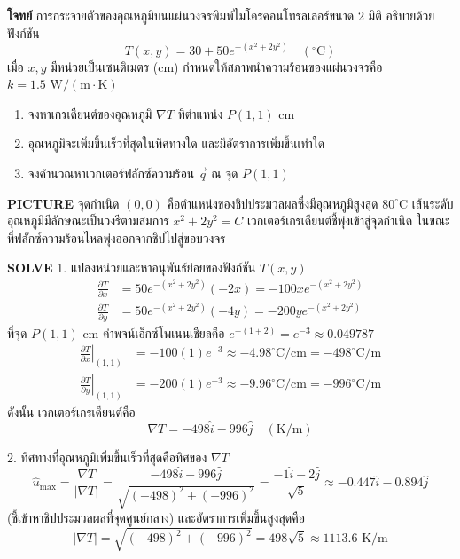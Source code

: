 \begin{mathexample}
\textbf{โจทย์} การกระจายตัวของอุณหภูมิบนแผ่นวงจรพิมพ์ไมโครคอนโทรลเลอร์ขนาด 2 มิติ อธิบายด้วยฟังก์ชัน
\begin{equation}
T(x, y) = 30 + 50 e^{-(x^2 + 2y^2)} \quad (^\circ\text{C})
\end{equation}
เมื่อ $x, y$ มีหน่วยเป็นเซนติเมตร ($\text{cm}$) กำหนดให้สภาพนำความร้อนของแผ่นวงจรคือ $k = 1.5\text{ W}/(\text{m}\cdot\text{K})$
\begin{enumerate}
    \item จงหาเกรเดียนต์ของอุณหภูมิ $\nabla T$ ที่ตำแหน่ง $P(1, 1)\text{ cm}$
    \item อุณหภูมิจะเพิ่มขึ้นเร็วที่สุดในทิศทางใด และมีอัตราการเพิ่มขึ้นเท่าใด
    \item จงคำนวณหาเวกเตอร์ฟลักซ์ความร้อน $\vec{q}$ ณ จุด $P(1, 1)$
\end{enumerate}

\vspace{0.2cm}
\textbf{PICTURE} จุดกำเนิด $(0,0)$ คือตำแหน่งของชิปประมวลผลซึ่งมีอุณหภูมิสูงสุด $80^\circ\text{C}$ เส้นระดับอุณหภูมิมีลักษณะเป็นวงรีตามสมการ $x^2 + 2y^2 = C$ เวกเตอร์เกรเดียนต์ชี้พุ่งเข้าสู่จุดกำเนิด ในขณะที่ฟลักซ์ความร้อนไหลพุ่งออกจากชิปไปสู่ขอบวงจร

\vspace{0.2cm}
\textbf{SOLVE}
1. แปลงหน่วยและหาอนุพันธ์ย่อยของฟังก์ชัน $T(x, y)$
\begin{align}
\frac{\partial T}{\partial x} &= 50 e^{-(x^2 + 2y^2)} (-2x) = -100x e^{-(x^2 + 2y^2)} \\
\frac{\partial T}{\partial y} &= 50 e^{-(x^2 + 2y^2)} (-4y) = -200y e^{-(x^2 + 2y^2)}
\end{align}
ที่จุด $P(1, 1)\text{ cm}$ ค่าพจน์เอ็กซ์โพเนนเชียลคือ $e^{-(1 + 2)} = e^{-3} \approx 0.049787$
\begin{align}
\left.\frac{\partial T}{\partial x}\right|_{(1,1)} &= -100(1) e^{-3} \approx -4.98^\circ\text{C/cm} = -498^\circ\text{C/m} \\
\left.\frac{\partial T}{\partial y}\right|_{(1,1)} &= -200(1) e^{-3} \approx -9.96^\circ\text{C/cm} = -996^\circ\text{C/m}
\end{align}
ดังนั้น เวกเตอร์เกรเดียนต์คือ
\begin{equation}
\nabla T = -498 \hat{i} - 996 \hat{j} \quad (\text{K/m})
\end{equation}

2. ทิศทางที่อุณหภูมิเพิ่มขึ้นเร็วที่สุดคือทิศของ $\nabla T$
\begin{equation}
\hat{u}_{\text{max}} = \frac{\nabla T}{|\nabla T|} = \frac{-498\hat{i} - 996\hat{j}}{\sqrt{(-498)^2 + (-996)^2}} = \frac{-1\hat{i} - 2\hat{j}}{\sqrt{5}} \approx -0.447\hat{i} - 0.894\hat{j}
\end{equation}
(ชี้เข้าหาชิปประมวลผลที่จุดศูนย์กลาง) และอัตราการเพิ่มขึ้นสูงสุดคือ
\begin{equation}
|\nabla T| = \sqrt{(-498)^2 + (-996)^2} = 498\sqrt{5} \approx 1113.6\text{ K/m}
\end{equation}


\end{mathexample}
